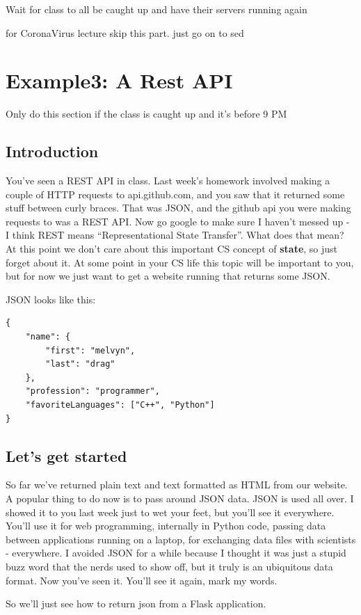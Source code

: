 \documentclass[10pt]{article}
\begin{document}
{\LARGE Wait for class to all be caught up and have their servers running again}


{\LARGE for CoronaVirus lecture skip this part. just go on to sed }

\section{Example3: A Rest API}
{\LARGE Only do this section if the class is caught up and it's before 9 PM}
\subsection{Introduction}
You've seen a REST API in class. Last week's homework involved making a couple
of HTTP requests to api.github.com, and you saw that it returned some stuff
between curly braces. That was JSON, and the github api you were making requests
to was a REST API. Now go google to make sure I haven't messed up - I think REST
means ``Representational State Transfer''. What does that mean? At this point we
don't care about this important CS concept of \textbf{state}, so just forget
about it. At some point in your CS life this topic will be important to you, but
for now we just want to get a website running that returns some JSON. 

JSON looks like this:

\begin{verbatim}
{
	"name": {
		"first": "melvyn",
		"last": "drag"
	},
	"profession": "programmer",
	"favoriteLanguages": ["C++", "Python"]
}
\end{verbatim}


\subsection{Let's get started}
So far we've returned plain text and text formatted as HTML from our website. A popular thing to do now is to pass around JSON data. JSON is used all over. I showed it to you last week just to wet your feet, but you'll see it everywhere. You'll use it for web programming, internally in Python code, passing data between applications running on a laptop, for exchanging data files with scientists - everywhere. I avoided JSON for a while because I thought it was just a stupid buzz word that the nerds used to show off, but it truly is an ubiquitous data format. Now you've seen it. You'll see it again, mark my words. 

So we'll just see how to return json from a Flask application.
\end{document}
